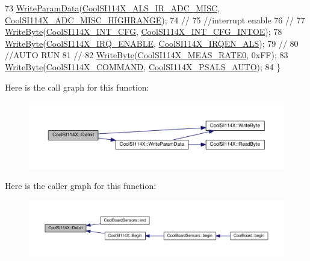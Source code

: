 \begin{DoxyCode}
73   \hyperlink{class_cool_s_i114_x_abf45eb10a6de1be16e68a51624fa2608}{WriteParamData}(\hyperlink{_cool_s_i114_x_8h_afedf11e5fd8d5c614ec41965621bdd71}{CoolSI114X\_ALS\_IR\_ADC\_MISC}, 
      \hyperlink{_cool_s_i114_x_8h_ae61574409fb527be2e1a3525845a74a2}{CoolSI114X\_ADC\_MISC\_HIGHRANGE});
74   \textcolor{comment}{//}
75   \textcolor{comment}{//interrupt enable}
76   \textcolor{comment}{//}
77   \hyperlink{class_cool_s_i114_x_ac5c8dc5ade604da7a1c8cd1586feefc2}{WriteByte}(\hyperlink{_cool_s_i114_x_8h_aba29521df18b7e2a307f5fbcdc37f2c8}{CoolSI114X\_INT\_CFG}, 
      \hyperlink{_cool_s_i114_x_8h_aec44709b497ca9fbf44b5d31c8258d31}{CoolSI114X\_INT\_CFG\_INTOE});  
78   \hyperlink{class_cool_s_i114_x_ac5c8dc5ade604da7a1c8cd1586feefc2}{WriteByte}(\hyperlink{_cool_s_i114_x_8h_a286ba10e3d74c8f266cd328de58d4290}{CoolSI114X\_IRQ\_ENABLE}, 
      \hyperlink{_cool_s_i114_x_8h_a13e0654dc939d5bac043b0c67bf9d8ca}{CoolSI114X\_IRQEN\_ALS});  
79   \textcolor{comment}{//}
80   \textcolor{comment}{//AUTO RUN}
81   \textcolor{comment}{//}
82   \hyperlink{class_cool_s_i114_x_ac5c8dc5ade604da7a1c8cd1586feefc2}{WriteByte}(\hyperlink{_cool_s_i114_x_8h_ac973af926c6e96ed2952ddfe6ae5d774}{CoolSI114X\_MEAS\_RATE0}, 0xFF);
83   \hyperlink{class_cool_s_i114_x_ac5c8dc5ade604da7a1c8cd1586feefc2}{WriteByte}(\hyperlink{_cool_s_i114_x_8h_af443805ce1c198eff43fb1b840c45500}{CoolSI114X\_COMMAND}, \hyperlink{_cool_s_i114_x_8h_a88143868753ba978c6c27fd08c564e4a}{CoolSI114X\_PSALS\_AUTO});
84 \}
\end{DoxyCode}
Here is the call graph for this function\+:\nopagebreak
\begin{figure}[H]
\begin{center}
\leavevmode
\includegraphics[width=350pt]{dd/d67/class_cool_s_i114_x_a6840abd53a2e3d71a6bb918077c6d6e6_cgraph}
\end{center}
\end{figure}
Here is the caller graph for this function\+:\nopagebreak
\begin{figure}[H]
\begin{center}
\leavevmode
\includegraphics[width=350pt]{dd/d67/class_cool_s_i114_x_a6840abd53a2e3d71a6bb918077c6d6e6_icgraph}
\end{center}
\end{figure}
\mbox{\label{class_cool_s_i114_x_acc20f8037e156ec4aadcbe90780b1e8b}} 
